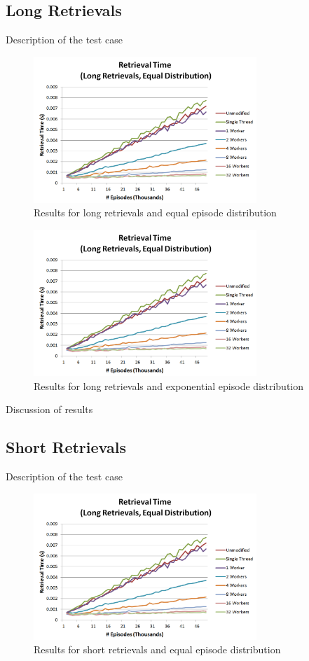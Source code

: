 \documentclass[11pt]{article} %
\begin{document}
\subsection{Long Retrievals}
Description of the test case
\begin{figure}[h]
\caption{Results for long retrievals and equal episode distribution}
\centering
\includegraphics[width=0.75\textwidth]{images/ret_worst_eq}
\end{figure}

\begin{figure}[h]
\caption{Results for long retrievals and exponential episode distribution}
\centering
\includegraphics[width=0.75\textwidth]{images/ret_worst_eq}
\end{figure}

Discussion of results


\subsection{Short Retrievals}
Description of the test case
\begin{figure}[h]
\caption{Results for short retrievals and equal episode distribution}
\centering
\includegraphics[width=0.75\textwidth]{images/ret_worst_eq}
\end{figure}
\end{document}
